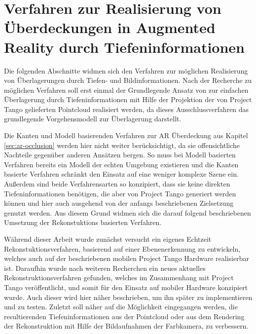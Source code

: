 \chapter{Verfahren zur Realisierung von Überdeckungen in Augmented Reality durch Tiefen\-informationen} \label{sec:optimization}


Die folgenden Abschnitte widmen sich den Verfahren zur möglichen Realisierung von Überlagerungen durch Tiefen- und Bildinformationen. Nach der Recherche zu möglichen Verfahren soll erst einmal der Grundlegende Ansatz von \citet{wloka1995resolving} zur einfachen Überlagerung durch Tiefeninformationen mit Hilfe der Projektion der von Project Tango gelieferten Pointcloud realisiert werden, da dieses Ausschlussverfahren das grundlegende Vorgehensmodell zur Überlagerung darstellt. 

Die Kanten und Modell basierenden Verfahren zur AR Überdeckung aus Kapitel \ref{sec:ar-occlusion} werden hier nicht weiter berücksichtigt, da sie offensichtliche Nachteile gegenüber anderen Ansätzen bergen. So muss bei Modell basierten Verfahren bereits ein Modell der echten Umgebung existieren und die Kanten basierte Verfahren schränkt den Einsatz auf eine weniger komplexe Szene ein. Außerdem sind beide Verfahrensarten so konzipiert, dass sie keine direkten Tiefeninformationen benötigen, die aber von Project Tango generiert werden können und hier auch ausgehend von der anfangs beschriebenen Zielsetzung genutzt werden. Aus diesem Grund widmen sich die darauf folgend beschriebenen Umsetzung der Rekonstuktions basierten Verfahren.

Während dieser Arbeit wurde zunächst versucht ein eigenes Echtzeit Rekonstuktionsverfahren, basierend auf einer Ebenenerkennung zu entwickeln, welches auch auf der beschriebenen mobilen Project Tango Hardware realisierbar ist. Daraufhin wurde nach weiteren Recherchen ein neues aktuelles Rekonstruktionsverfahren gefunden, welches im Zusammenhang mit Project Tango veröffentlicht, und somit für den Einsatz auf mobiler Hardware konzipiert wurde. Auch dieser wird hier näher beschrieben, um ihn später zu implementieren und zu testen. Zuletzt soll näher auf die Möglichkeit eingegangen werden, die resultierenden Tiefeninformationen aus der Pointcloud oder aus dem Rendering der Rekonstruktion mit Hilfe der Bildaufnahmen der Farbkamera, zu verbessern. 









